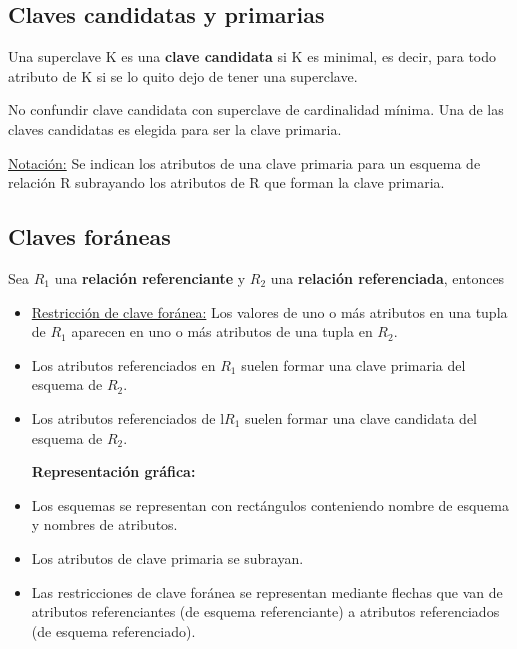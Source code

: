 \documentclass[12pt,a4paper]{report}
\begin{document}
		\subsection{Claves candidatas y primarias}
			\par Una superclave K es una \textbf{clave candidata} si K es minimal, es decir, para todo atributo de K si se lo quito dejo de tener una superclave.
			\par No confundir clave candidata con superclave de cardinalidad mínima. Una de las claves candidatas es elegida para ser la clave primaria.
			\vspace{5mm}
			\par \underline{Notación:} Se indican los atributos de una clave primaria para un esquema de relación R subrayando los atributos de R que forman la clave primaria.

		\subsection{Claves foráneas}
			\par Sea $R_{1}$ una \textbf{relación referenciante} y $R_{2}$ una \textbf{relación referenciada}, entonces
			\begin{itemize}
				\item \underline{Restricción de clave foránea:} Los valores de uno o más atributos en una tupla de $R_{1}$ aparecen en uno o más atributos de una tupla en $R_{2}$.
				\item Los atributos referenciados en $R_{1}$ suelen formar una clave primaria del esquema de $R_{2}$.
				\item Los atributos referenciados de l$R_{1}$ suelen formar una clave candidata del esquema de $R_{2}$.
				
				\vspace{5mm}
				\textbf{Representación gráfica:}
				\item Los esquemas se representan con rectángulos conteniendo nombre de esquema y nombres de atributos.
				\item Los atributos de clave primaria se subrayan.
				\item Las restricciones de clave foránea se representan mediante flechas que van de atributos referenciantes (de esquema referenciante) a atributos referenciados (de esquema referenciado).
			\end{itemize}
\end{document}

